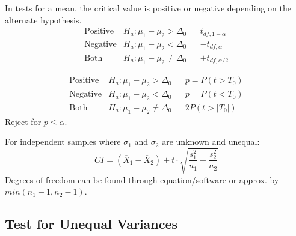 \documentclass[]{article}
\newenvironment{definitions}{
	\begin{description}[font=\sffamily\bfseries, leftmargin=1cm, style=nextline]
	}{
	\end{description}
}
\begin{document}
\begin{definitions}
	In tests for a mean, the critical value is positive or negative depending on the alternate hypothesis.
	\[
	\begin{array}{llcl}
		\text{Positive} & H_a: \mu_1 - \mu_2 > \Delta_0 && t_{df, 1-\alpha}\\
		\text{Negative} & H_a: \mu_1 - \mu_2 < \Delta_0 && -t_{df,\alpha}\\
		\text{Both} & H_a: \mu_1 - \mu_2 \neq \Delta_0 && \pm t_{df,\alpha/2}
	\end{array}
	\]
	\item[Rejection criteria -- p-value]
	\[
	\begin{array}{llcl}
		\text{Positive} & H_a: \mu_1 - \mu_2 > \Delta_0 && p = P(t > T_0)\\
		\text{Negative} & H_a: \mu_1 - \mu_2 < \Delta_0 && p = P(t < T_0)\\
		\text{Both} & H_a: \mu_1 - \mu_2 \neq \Delta_0 && 2P(t > |T_0|)
	\end{array}
	\]
	Reject for $p \leq \alpha$.
	\item[Confidence intervals for independent data]
	For independent samples where $\sigma_1$ and $\sigma_2$ are unknown and unequal:
	\[ CI = (\overline{X}_1 - \overline{X}_2) \pm t \cdot \sqrt{\frac{s_1^2}{n_1}+\frac{s_2^2}{n_2}} \]
	Degrees of freedom can be found through equation/software or approx. by $min(n_1-1,n_2-1)$.
	
\end{definitions}

\subsection{Test for Unequal Variances}
\end{document}
